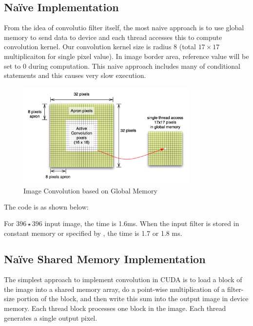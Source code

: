 \subsection{Na\"ive  Implementation}
From the idea of convolutio filter itself, the most naive approach is to use global memory to send data to device and each thread accesses this to compute convolution kernel. Our convolution kernel size is radius 8 (total $17 \times 17$ multiplicaiton for single pixel value). In image border area, reference value will be set to 0 during computation. This naive approach includes many of conditional statements and this causes very slow execution.
\begin{figure}[!hbtp]
\centering
\includegraphics[width=0.8\textwidth]{CUDAImageProcessing/ImageConvoOnGlobal}
\caption{Image Convolution based on Global Memory}
\label{fig3.1}
\end{figure}
The code is as shown below:




For $396 \star 396$ input image, the time is 1.6ms.
When the input filter is stored in constant memory or specified by {\color{red}{'\_\_restrict\_\_'}}, the time is 1.7 or 1.8 ms.

\subsection{Na\"ive Shared Memory Implementation}
The simplest approach to implement convolution in CUDA is to load a block of the
image into a shared memory array, do a point-wise multiplication of a filter-size portion of
the block, and then write this sum into the output image in device memory. Each thread
block processes one block in the image. Each thread generates a single output pixel.


